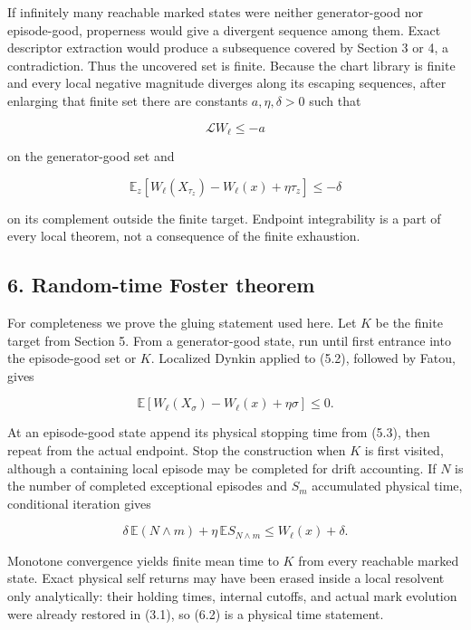 If infinitely many reachable marked states were neither generator-good
nor episode-good, properness would give a divergent sequence among them.
Exact descriptor extraction would produce a subsequence covered by
Section 3 or 4, a contradiction. Thus the uncovered set is finite.
Because the chart library is finite and every local negative magnitude
diverges along its escaping sequences, after enlarging that finite set
there are constants \(a,\eta,\delta>0\) such that

\[
 \mathcal LW_\ell\le-a                                \tag{5.2}
\]

on the generator-good set and

\[
 \mathbb E_z[W_\ell(X_{\tau_z})-W_\ell(x)+
                   \eta\tau_z]\le-\delta             \tag{5.3}
\]

on its complement outside the finite target. Endpoint integrability is a
part of every local theorem, not a consequence of the finite exhaustion.

\subsection{6. Random-time Foster
theorem}

For completeness we prove the gluing statement used here. Let \(K\) be
the finite target from Section 5. From a generator-good state, run until
first entrance into the episode-good set or \(K\). Localized Dynkin
applied to (5.2), followed by Fatou, gives

\[
 \mathbb E[W_\ell(X_\sigma)-W_\ell(x)+
                 \eta\sigma]\le0.                  \tag{6.1}
\]

At an episode-good state append its physical stopping time from (5.3),
then repeat from the actual endpoint. Stop the construction when \(K\)
is first visited, although a containing local episode may be completed
for drift accounting. If \(N\) is the number of completed exceptional
episodes and \(S_m\) accumulated physical time, conditional iteration
gives

\[
 \delta\,\mathbb E(N\wedge m)
 +\eta\,\mathbb E S_{N\wedge m}
 \le W_\ell(x)+\delta.                              \tag{6.2}
\]

Monotone convergence yields finite mean time to \(K\) from every
reachable marked state. Exact physical self returns may have been erased
inside a local resolvent only analytically: their holding times,
internal cutoffs, and actual mark evolution were already restored in
(3.1), so (6.2) is a physical time statement.

